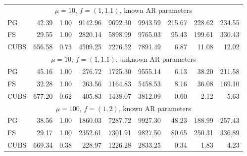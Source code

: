 \documentclass[12pt]{article}
\begin{document}
\begin{table}
\begin{center}
\begin{tabular}{l r r r r r r r r }
 \multicolumn{9}{c}{$\mu=10$, $f = (1,1.1)$, known AR parameters} \\
            PG  &    42.39 &     1.00 &   9142.96 &   9692.30 &   9943.59 &    215.67 &    228.62 &    234.55 \\ 
            FS  &    29.55 &     1.00 &   2820.14 &   5898.99 &   9765.03 &     95.43 &    199.61 &    330.43 \\ 
          CUBS  &   656.58 &     0.73 &   4509.25 &   7276.52 &   7891.49 &      6.87 &     11.08 &     12.02

 \\ %

 \multicolumn{9}{c}{$\mu=10$, $f = (1,1.1)$, unknown AR parameters} \\
             PG   &    45.16 &     1.00 &    276.72 &   1725.30 &   9555.14 &      6.13 &     38.20 &    211.58 \\ 
             FS   &    32.28 &     1.00 &    263.56 &   1164.83 &   5458.53 &      8.16 &     36.08 &    169.10 \\ 
           CUBS   &   677.20 &     0.62 &    405.83 &   1438.07 &   3812.09 &      0.60 &      2.12 &      5.63
 \\ %

 \multicolumn{9}{c}{$\mu=100$, $f = (1,2)$, known AR parameters} \\
            PG  &    38.56 &     1.00 &   1860.03 &   7287.72 &   9927.30 &     48.23 &    188.99 &    257.43 \\ 
            FS  &    29.17 &     1.00 &   2352.61 &   7301.91 &   9827.50 &     80.65 &    250.31 &    336.89 \\ 
          CUBS  &   669.34 &     0.38 &    228.97 &   1226.28 &   2833.25 &      0.34 &      1.83 &      4.23


\end{tabular}
\end{center}
\end{table}
\end{document}
